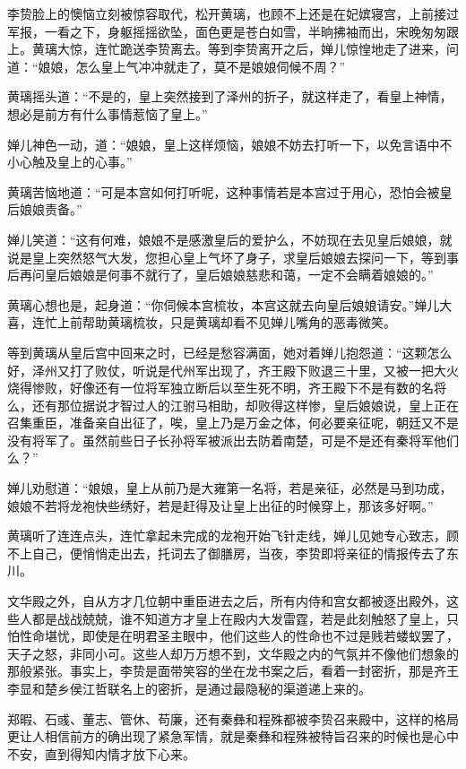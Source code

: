 李贽脸上的懊恼立刻被惊容取代，松开黄璃，也顾不上还是在妃嫔寝宫，上前接过军报，一看之下，身躯摇摇欲坠，面色更是苍白如雪，半晌拂袖而出，宋晚匆匆跟上。黄璃大惊，连忙跪送李贽离去。等到李贽离开之后，婵儿惊惶地走了进来，问道：“娘娘，怎么皇上气冲冲就走了，莫不是娘娘伺候不周？”

黄璃摇头道：“不是的，皇上突然接到了泽州的折子，就这样走了，看皇上神情，想必是前方有什么事情惹恼了皇上。”

婵儿神色一动，道：“娘娘，皇上这样烦恼，娘娘不妨去打听一下，以免言语中不小心触及皇上的心事。”

黄璃苦恼地道：“可是本宫如何打听呢，这种事情若是本宫过于用心，恐怕会被皇后娘娘责备。”

婵儿笑道：“这有何难，娘娘不是感激皇后的爱护么，不妨现在去见皇后娘娘，就说是皇上突然怒气大发，您担心皇上气坏了身子，求皇后娘娘去探问一下，等到事后再问皇后娘娘是何事不就行了，皇后娘娘慈悲和蔼，一定不会瞒着娘娘的。”

黄璃心想也是，起身道：“你伺候本宫梳妆，本宫这就去向皇后娘娘请安。”婵儿大喜，连忙上前帮助黄璃梳妆，只是黄璃却看不见婵儿嘴角的恶毒微笑。

等到黄璃从皇后宫中回来之时，已经是愁容满面，她对着婵儿抱怨道：“这颗怎么好，泽州又打了败仗，听说是代州军出现了，齐王殿下败退三十里，又被一把大火烧得惨败，好像还有一位将军独立断后以至生死不明，齐王殿下不是有数的名将么，还有那位据说才智过人的江驸马相助，却败得这样惨，皇后娘娘说，皇上正在召集重臣，准备亲自出征了，唉，皇上乃是万金之体，何必要亲征呢，朝廷又不是没有将军了。虽然前些日子长孙将军被派出去防着南楚，可是不是还有秦将军他们么？”

婵儿劝慰道：“娘娘，皇上从前乃是大雍第一名将，若是亲征，必然是马到功成，娘娘不若将龙袍快些绣好，若是赶得及让皇上出征的时候穿上，那该多好啊。”

黄璃听了连连点头，连忙拿起未完成的龙袍开始飞针走线，婵儿见她专心致志，顾不上自己，便悄悄走出去，托词去了御膳房，当夜，李贽即将亲征的情报传去了东川。

文华殿之外，自从方才几位朝中重臣进去之后，所有内侍和宫女都被逐出殿外，这些人都是战战兢兢，谁不知道方才皇上在殿内大发雷霆，若是此刻触怒了皇上，只怕性命堪忧，即使是在明君圣主眼中，他们这些人的性命也不过是贱若蝼蚁罢了，天子之怒，非同小可。这些人却万万想不到，文华殿之内的气氛并不像他们想象的那般紧张。事实上，李贽是面带笑容的坐在龙书案之后，看着一封密折，那是齐王李显和楚乡侯江哲联名上的密折，是通过最隐秘的渠道递上来的。

郑暇、石彧、董志、管休、苟廉，还有秦彝和程殊都被李贽召来殿中，这样的格局更让人相信前方的确出现了紧急军情，就是秦彝和程殊被特旨召来的时候也是心中不安，直到得知内情才放下心来。

